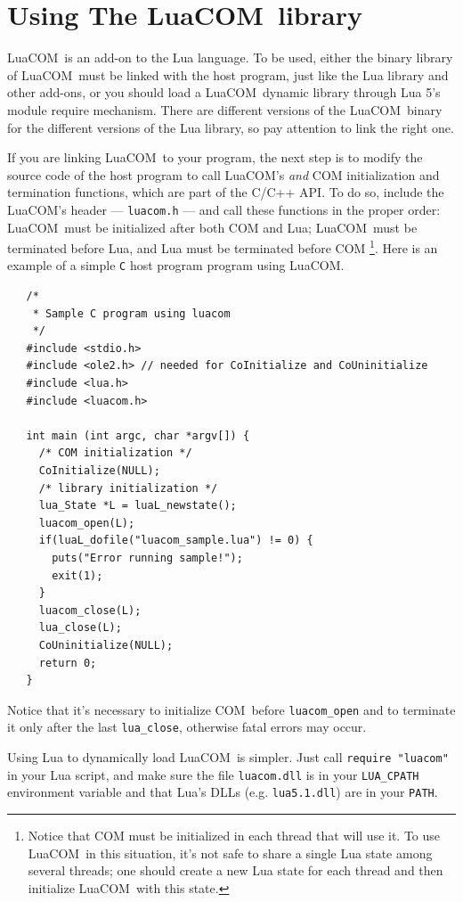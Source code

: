 \documentclass[11pt,a4paper,english]{report}
\newcommand{\ident}[1]{\mbox{\texttt{#1}}}
\newcommand{\techname}[1]{\mbox{#1}}
\newcommand{\com}{\techname{COM}}
\newcommand{\luacom}{\techname{LuaCOM}}
\begin{document}
\section{Using The \luacom\ library}

  \luacom\ is an add-on to the Lua language. To be used, either the binary
  library of \luacom\ must be linked with the host program, just like
  the Lua library and other add-ons, or you should load a \luacom\ dynamic
  library through Lua 5's module require mechanism.
  There are different versions of the \luacom\ binary for the different
  versions of the Lua library, so pay attention to link the right one.

  If you are linking \luacom\ to your program, the next step is to modify
  the source code of the host program to
  call \luacom's \emph{and} COM initialization and termination
  functions, which are part of the C/C++ API. To do so, include the
  \luacom 's header --- \verb+luacom.h+ --- and call these functions
  in the proper order: \luacom\ must be initialized after both COM and Lua;
  \luacom\ must be terminated before Lua, and Lua must be terminated
  before COM
  \footnote{Notice that COM must be initialized in each thread that
  will use it. To use \luacom\ in this situation, it's not safe to
  share a single Lua state among several threads; one should create a
  new Lua state for each thread and then initialize \luacom\ with this
  state.}. Here is an example of a simple \ident{C} host program
  program using \luacom.

{\small
\begin{verbatim}
   /*
    * Sample C program using luacom
    */
   #include <stdio.h>
   #include <ole2.h> // needed for CoInitialize and CoUninitialize
   #include <lua.h>
   #include <luacom.h>

   int main (int argc, char *argv[]) {
     /* COM initialization */
     CoInitialize(NULL);
     /* library initialization */
     lua_State *L = luaL_newstate();
     luacom_open(L);
     if(luaL_dofile("luacom_sample.lua") != 0) {
       puts("Error running sample!");
       exit(1);
     }
     luacom_close(L);
     lua_close(L);
     CoUninitialize(NULL);
     return 0;
   }
\end{verbatim}}
\noindent
Notice that it's necessary to initialize \com\ before
\verb+luacom_open+ and to terminate it only after the last
\verb+lua_close+, otherwise fatal errors may occur.

Using Lua to dynamically load \luacom\ is simpler. Just call
\verb+require "luacom"+ in your Lua script, and make sure the file
\verb+luacom.dll+ is in your \verb+LUA_CPATH+ environment variable and
that Lua's DLLs (e.g. \verb+lua5.1.dll+) are in your \verb+PATH+.
\end{document}
